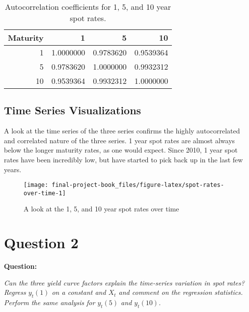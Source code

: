 \documentclass[openany]{book}
\theoremstyle{definition}
\theoremstyle{definition}
\theoremstyle{definition}
\theoremstyle{remark}
\begin{document}
\small

\begin{table}[H]

\caption{\label{tab:correlations}Autocorrelation coefficients for 1, 5, and 10 year spot rates.}
\centering
\begin{tabular}[t]{rrrr}
\toprule
Maturity & 1 & 5 & 10\\
\midrule
1 & 1.0000000 & 0.9783620 & 0.9539364\\
5 & 0.9783620 & 1.0000000 & 0.9932312\\
10 & 0.9539364 & 0.9932312 & 1.0000000\\
\bottomrule
\end{tabular}
\end{table}

\normalsize

\hypertarget{time-series-visualizations}{%
\section{Time Series Visualizations}\label{time-series-visualizations}}

A look at the time series of the three series confirms the highly
autocorrelated and correlated nature of the three series. 1 year spot
rates are almost always below the longer maturity rates, as one would
expect. Since 2010, 1 year spot rates have been incredibly low, but have
started to pick back up in the last few years.

\small

\begin{figure}[H]

{\centering \texttt{[image: final-project-book\_files/figure-latex/spot-rates-over-time-1]} 

}

\caption{A look at the 1, 5, and 10 year spot rates over time}\label{fig:spot-rates-over-time}
\end{figure}

\normalsize

\small

\normalsize

\hypertarget{q2}{%
\chapter{Question 2}\label{q2}}

\textbf{Question:}

\emph{Can the three yield curve factors explain the time-series
variation in spot rates? Regress \(y_t(1)\) on a constant and \(X_t\)
and comment on the regression statistics. Perform the same analysis for
\(y_t(5)\) and \(y_t(10)\).}
\end{document}
